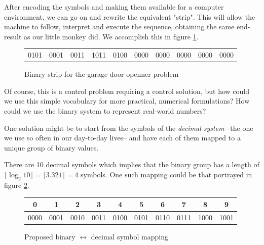 \documentclass[12pt, a4paper]{book}
\begin{document}
After encoding the symbols and making them available for a computer environment, we can go on and rewrite the equivalent "strip". This will allow the machine to follow, interpret and execute the sequence, obtaining the same end-result as our little monkey did. We accomplish this in figure \ref{fig:garage binary strip}.

\begin{figure}[h]
  \centering  
  \begin{tabular}{c | c | c | c | c | c | c | c | c | c}
    {\large 0101} & 
    {\large 0001} & 
    {\large 0011} & 
    {\large 1011} &
    {\large 0100} &
    {\large 0000} &
    {\large 0000} &
    {\large 0000} &
    {\large 0000} &
    {\large 0000} \\
  \end{tabular}
  \caption{Binary strip for the garage door openner problem}
  \label{fig:garage binary strip}
\end{figure}

Of course, this is a control problem requiring a control solution, but how could we use this simple vocabulary for more practical, numerical formulations? How could we use the binary system to represent real-world numbers?

One solution might be to start from the symbols of the \textit{decimal system} --the one we use so often in our day-to-day lives-- and have each of them mapped to a unique group of binary values. 

There are 10 decimal symbols which implies that the binary group has a length of $\lceil \log_2 10 \rceil = \lceil 3.321 \rceil = 4$ symbols. One such mapping could be that portrayed in figure \ref{fig:binary-decimal initial mapping}.

\begin{figure}[h]
  \centering
  \renewcommand{\arraystretch}{1.5}
  \begin{tabular}{c | c | c | c | c | c | c | c | c | c}
    {\Large 0} & {\Large 1} & {\Large 2} & {\Large 3} & {\Large 4} & {\Large 5} & {\Large 6} & {\Large 7} & {\Large 8} & {\Large 9} \\ \hline
    {\large 0000} & {\large 0001} & {\large 0010} & {\large 0011} & {\large 0100} & {\large 0101} & {\large 0110} & {\large 0111} & {\large 1000} & {\large 1001} \\
  \end{tabular}
  \renewcommand{\arraystretch}{1.0}
  \caption{Proposed binary $\leftrightarrow$ decimal symbol mapping}
  \label{fig:binary-decimal initial mapping}
\end{figure}
\end{document}
